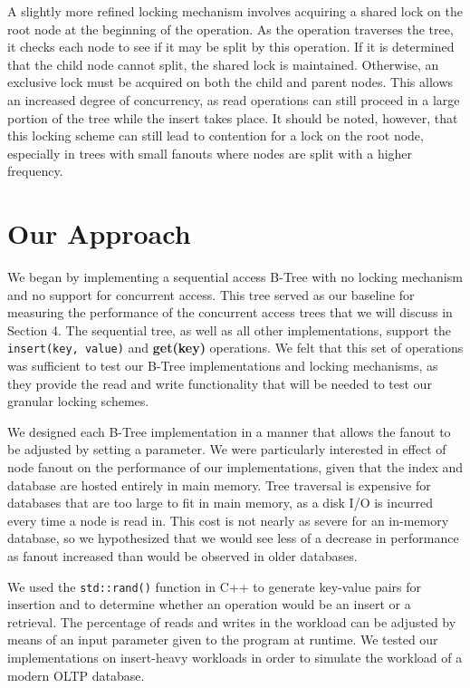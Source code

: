 \documentclass{sig-alternate}
\begin{document}
A slightly more refined locking mechanism involves acquiring a shared lock on the root node at the beginning of the operation. As the operation traverses the tree, it checks each node to see if it may be split by this operation. If it is determined that the child node cannot split, the shared lock is maintained. Otherwise, an exclusive lock must be acquired on both the child and parent nodes. This allows an increased degree of concurrency, as read operations can still proceed in a large portion of the tree while the insert takes place\cite{graefe:survey}\cite{lehman:locking}.  It should be noted, however, that this locking scheme can still lead to contention for a lock on the root node, especially in trees with small fanouts where nodes are split with a higher frequency.

\section{Our Approach}
We began by implementing a sequential access B-Tree with no locking mechanism and no support for concurrent access. This tree served as our baseline for measuring the performance of the concurrent access trees that we will discuss in Section 4. The sequential tree, as well as all other implementations, support the \texttt{insert(key, value)} and \textbf{get(key)} operations. We felt that this set of operations was sufficient to test our B-Tree implementations and locking mechanisms, as they provide the read and write functionality that will be needed to test our granular locking schemes.

We designed each B-Tree implementation in a manner that allows the fanout to be adjusted by setting a parameter. We were particularly interested in effect of node fanout on the performance of our implementations, given that the index and database are hosted entirely in main memory. Tree traversal is expensive for databases that are too large to fit in main memory, as a disk I/O is incurred every time a node is read in. This cost is not nearly as severe for an in-memory database, so we hypothesized that we would see less of a decrease in performance as fanout increased than would be observed in older databases.

We used the \texttt{std::rand()} function in C++ to generate key-value pairs for insertion and to determine whether an operation would be an insert or a retrieval. The percentage of reads and writes in the workload can be adjusted by means of an input parameter given to the program at runtime. We tested our implementations on insert-heavy workloads in order to simulate the workload of a modern OLTP database.
\end{document}
